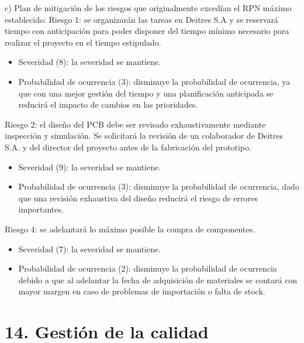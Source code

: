 \documentclass[
11pt, %
]{charter}
\begin{document}
\pagebreak
c) Plan de mitigación de los riesgos que originalmente excedían el RPN máximo establecido: 
Riesgo 1: se organizarán las tareas en Deitres S.A y se reservará tiempo con anticipación para poder disponer del tiempo mínimo necesario para realizar el proyecto en el tiempo estipulado.
  \begin{itemize}
	\item Severidad (8): la severidad se mantiene.
	\item Probabilidad de ocurrencia (3): disminuye la probabilidad de ocurrencia, ya que con una mejor gestión del tiempo y una planificación anticipada se reducirá el impacto de cambios en las prioridades.
	\end{itemize}
Riesgo 2:  el diseño del PCB debe ser revisado exhaustivamente mediante inspección y simulación. Se solicitará la revisión de un colaborador de Deitres S.A. y del director del proyecto antes de la fabricación del prototipo.
  \begin{itemize}
	\item Severidad (9): la severidad se mantiene.
	\item Probabilidad de ocurrencia (3):  disminuye la probabilidad de ocurrencia, dado que una revisión exhaustiva del diseño reducirá el riesgo de errores importantes.
	\end{itemize}
Riesgo 4: se adelantará lo máximo posible la compra de componentes.
  \begin{itemize}
	\item Severidad (7): la severidad se mantiene.
	\item Probabilidad de ocurrencia (2):  disminuye la probabilidad de ocurrencia debido a que al adelantar la fecha de adquisición de materiales se contará con mayor margen en caso de problemas de importación o falta de stock.
	\end{itemize}

\section{14. Gestión de la calidad}
\label{sec:calidad}
\end{document}
